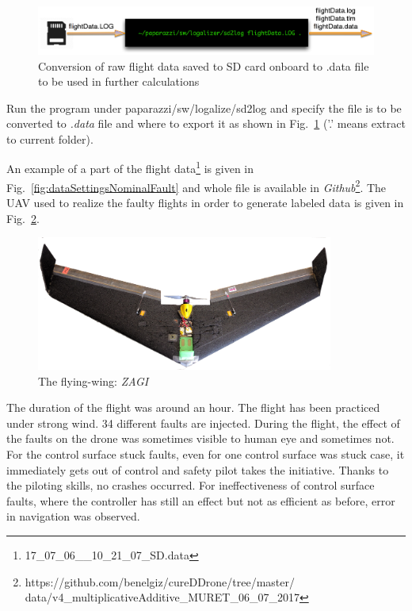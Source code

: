 \begin{figure}[h]
\begin{center}
\includegraphics[width=15cm]{figures/dataManip}    %
\caption{Conversion of raw flight data saved to SD card onboard to .data file to be used in further calculations} 
\label{fig:dataManip}
\end{center}
\end{figure}

Run the program under paparazzi/sw/logalize/sd2log and specify the file is to be converted to \emph{.data} file and where to export it as shown in Fig.~\ref{fig:dataManip} ('.' means extract to current folder). 

An example of a part of the flight data\footnote{17\_07\_06\_\_10\_21\_07\_SD.data} is given in Fig.~\ref{fig:dataSettingsNominalFault} and whole file is available in \emph{Github}\footnote{https://github.com/benelgiz/cureDDrone/tree/master/ \\ data/v4\_multiplicativeAdditive\_MURET\_06\_07\_2017}. 
The UAV used to realize the faulty flights in order to generate labeled data is given in Fig.~\ref{fig:zagi}. 

\begin{figure}[h]
\begin{center}
\includegraphics[width=0.87\textwidth]{figures/zagi}    %
\caption{The flying-wing: \emph{ZAGI}} 
\label{fig:zagi}
\end{center}
\end{figure}

The duration of the flight was around an hour. 
The flight has been practiced under strong wind. 
34 different faults are injected.
During the flight, the effect of the faults on the drone was sometimes visible to human eye and sometimes not. 
For the control surface stuck faults, even for one control surface was stuck case, it immediately gets out of control and safety pilot takes the initiative. 
Thanks to the piloting skills, no crashes occurred. 
For ineffectiveness of control surface faults, where the controller has still an effect but not as efficient as before, error in navigation was observed.  

